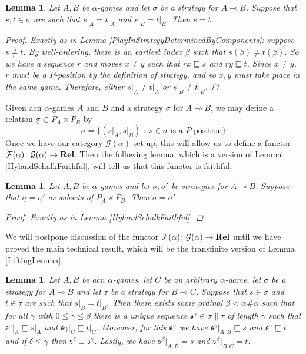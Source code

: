 \documentclass[11pt]{article} %
\theoremstyle{plain} %
\newtheorem{lemma}[theorem]{Lemma}
\theoremstyle{definition} %
\theoremstyle{note}
\theoremstyle{exercisestyle}
\newcommand{\catname}[1]{{\normalfont\textbf{#1}}}
\newcommand{\Rel}{\catname{Rel}}
\newcommand*\from{\colon}
\newcommand{\cmap}[3]{#1\from{}#2\to{}#3}
\renewcommand{\implies}{\multimap}
\newcommand{\G}{\mathcal G}
\newcommand{\suchthat}{\;\colon\;}
\newcommand{\F}{\mathcal F}
\newcommand{\s}{\mathfrak s}
\newcommand{\prefix}{\sqsubseteq}
\newcommand{\grel}[1]{\underline{#1}}
\begin{document}
\begin{lemma}
  \label{TransPlayInStrategyDeterminedByComponents}
  Let $A,B$ be $\alpha$-games and let $\sigma$ be a strategy for $A\implies B$.  Suppose that $s,t\in\sigma$ are such that $s\vert_A=t\vert_A$ and $s\vert_B=t\vert_B$.  Then $s=t$.
  \begin{proof}
    Exactly as in Lemma \ref{PlayInStrategyDeterminedByComponents}: suppose $s\ne t$.  By well-ordering, there is an earliest index $\beta$ such that $s(\beta)\ne t(\beta)$.  So we have a sequence $r$ and moves $x\ne y$ such that $rx\prefix s$ and $ry\prefix t$.  Since $x\ne y$, $r$ must be a $P$-position by the definition of strategy, and so $x,y$ must take place in the same game.  Therefore, either $s\vert_A\ne t\vert_A$ or $s\vert_B\ne t\vert_B$.
  \end{proof}
\end{lemma}

Given acn $\alpha$-games $A$ and $B$ and a strategy $\sigma$ for $A\implies B$, we may define a relation $\grel\sigma\subset P_A\times P_B$ by
\[
  \grel\sigma = \{(s\vert_A,s\vert_B)\suchthat\textrm{$s\in\sigma$ is a $P$-position}\}
  \]
Once we have our category $\G(\alpha)$ set up, this will allow us to define a functor $\cmap{\F(\alpha)}{\G(\alpha)}{\Rel}$.  Then the following lemma, which is a version of Lemma \ref{HylandSchalkFaithful}, will tell us that this functor is faithful.

\begin{lemma}
  \label{TransHylandSchalkFaithful}
  Let $A,B$ be $\alpha$-games and let $\sigma,\sigma'$ be strategies for $A\implies B$.  Suppose that $\grel\sigma=\grel{\sigma'}$ as subsets of $P_A\times P_B$.  Then $\sigma=\sigma'$.
  \begin{proof}
    Exactly as in Lemma \ref{HylandSchalkFaithful}.
  \end{proof}
\end{lemma}

We will postpone discussion of the functor $\cmap{\F(\alpha)}{\G(\alpha)}{\Rel}$ until we have proved the main technical result, which will be the transfinite version of Lemma \ref{LiftingLemma}.  

\begin{lemma}
  \label{TransLiftingLemma}
  Let $A,B$ be acn $\alpha$-games, let $C$ be an arbitrary $\alpha$-game, let $\sigma$ be a strategy for $A\implies B$ and let $\tau$ be a strategy for $B\implies C$.  Suppose that $s\in\sigma$ and $t\in\tau$ are such that $s\vert_B=t\vert_B$.  Then there exists some ordinal $\beta<\alpha\#\alpha$ such that for all $\gamma$ with $0\le\gamma\le\beta$ there is a unique sequence $\s^\gamma\in\sigma\|\tau$ of length $\gamma$ such that $\s^\gamma\vert_A\prefix s\vert_A$ and $\s\gamma\vert_C\prefix t\vert_C$.  Moreover, for this $\s^\gamma$ we have $\s^\gamma\vert_{A,B}\prefix s$ and $\s^\gamma\prefix t$ and if $\delta\le\gamma$ then $\s^\delta\prefix\s^\gamma$.  Lastly, we have $\s^\beta\vert_{A,B}=s$ and $\s^\beta\vert_{B,C}=t$.
\end{lemma}
\end{document}
